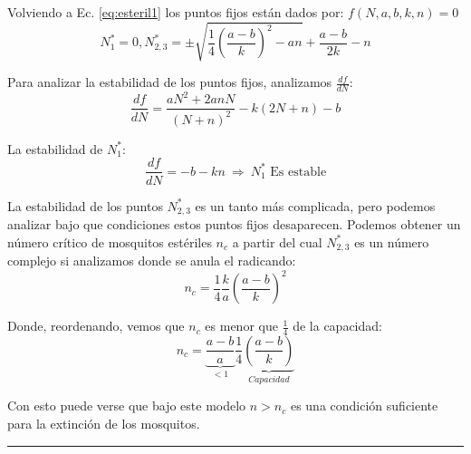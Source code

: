 \documentclass[twocolumn,aps,prl]{revtex4-1}
\newcommand{\Nstar}{N^*}
\newcommand*\sepline{%
  \begin{center}
    \rule[1ex]{.5\textwidth}{.5pt}
  \end{center}}
\begin{document}
Volviendo a Ec. \ref{eq:esteril1} los puntos fijos están dados por: $f(N,a,b,k,n) = 0$
$$
\Nstar_1 = 0, 
\Nstar_{2,3} = \pm 
\sqrt{
    \frac{1}{4} \left( \frac{a-b}{k} \right)^2 - a n 
    }
+ \frac{a-b}{2k} 
- n
$$

Para analizar la estabilidad de los puntos fijos, analizamos $\frac{d f}{d N}$:
$$
\frac{d f}{d N} = \frac{ aN^2 + 2 a n N}{( N + n )^2}
- k (2N + n) - b 
$$

La estabilidad de $\Nstar_1$:
$$
\frac{d f}{d N} = - b - k  n  
\ \Rightarrow  \ 
\Nstar_1 \text{  Es estable}
$$

La estabilidad de los puntos $\Nstar_{2,3}$ es un tanto más complicada, pero podemos analizar bajo que condiciones estos puntos fijos desaparecen. Podemos obtener un número crítico de mosquitos estériles $n_c$ a partir del cual $\Nstar_{2,3}$ es un número complejo si analizamos donde se anula el radicando:
$$
n_c =  
\frac{1}{4} 
\frac{k}{a} 
\left( \frac{a-b}{k} \right)^2
$$

Donde, reordenando, vemos que $n_c$ es menor que $ \frac{1}{4} $ de la capacidad:
$$
n_c =  
\underbrace{\frac{a-b}{a} }_{<1}
\frac{1}{4} 
\underbrace{\left( \frac{a-b}{k} \right)}_{Capacidad }
$$

Con esto puede verse que bajo este modelo $n > n_c$ es una condición suficiente para la extinción de los mosquitos.

\sepline
\end{document}
